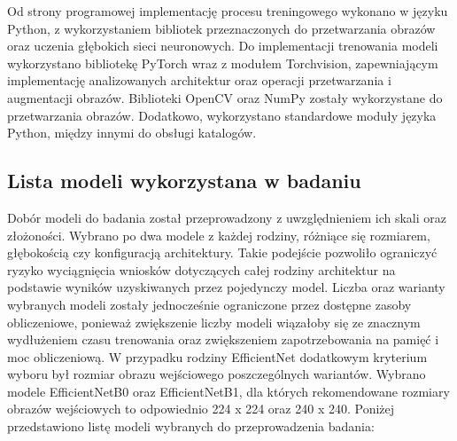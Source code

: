 Od strony programowej implementację procesu treningowego wykonano w języku Python, z wykorzystaniem bibliotek przeznaczonych do przetwarzania obrazów oraz uczenia głębokich sieci neuronowych. Do implementacji trenowania modeli wykorzystano bibliotekę PyTorch wraz z modułem Torchvision, zapewniającym implementację analizowanych architektur oraz operacji przetwarzania i augmentacji obrazów. Biblioteki OpenCV oraz NumPy zostały wykorzystane do przetwarzania obrazów. Dodatkowo, wykorzystano standardowe moduły języka Python, między innymi do obsługi katalogów.

\subsection{Lista modeli wykorzystana w badaniu}
Dobór modeli do badania został przeprowadzony z uwzględnieniem ich skali oraz złożoności. Wybrano po dwa modele  z każdej rodziny, różniące się rozmiarem, głębokością czy konfiguracją architektury. Takie podejście pozwoliło ograniczyć ryzyko wyciągnięcia wniosków dotyczących całej rodziny architektur na podstawie wyników uzyskiwanych przez pojedynczy model. Liczba oraz warianty wybranych modeli zostały jednocześnie ograniczone przez dostępne zasoby obliczeniowe, ponieważ zwiększenie liczby modeli wiązałoby się ze znacznym wydłużeniem czasu trenowania oraz zwiększeniem zapotrzebowania na pamięć i moc obliczeniową. W przypadku rodziny EfficientNet dodatkowym kryterium wyboru był rozmiar obrazu wejściowego poszczególnych wariantów. Wybrano modele EfficientNetB0 oraz EfficientNetB1, dla których rekomendowane rozmiary obrazów wejściowych to odpowiednio 224 x 224 oraz 240 x 240.
Poniżej przedstawiono listę modeli wybranych do przeprowadzenia badania:
